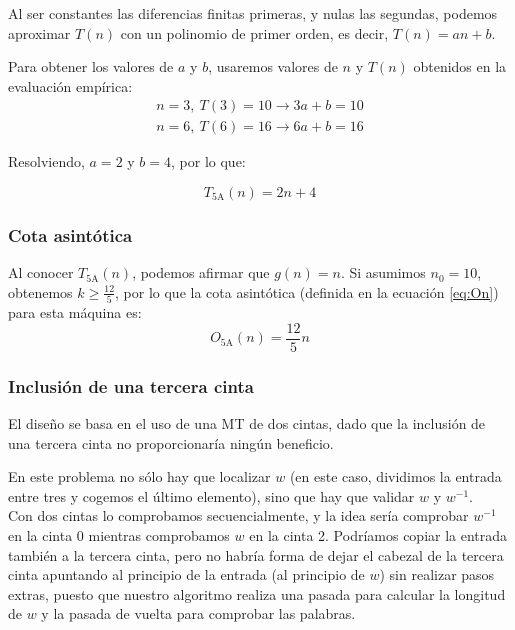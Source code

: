 Al ser constantes las diferencias finitas primeras, y nulas las segundas, podemos aproximar $T(n)$ con un polinomio de primer orden, es decir, $T(n) = an + b$.\medskip

Para obtener los valores de $a$ y $b$, usaremos valores de $n$ y $T(n)$ obtenidos en la evaluación empírica:
\begin{subequations}
    \begin{gather*}
        n = 3,\ T(3) = 10 \rightarrow 3a + b = 10 \\
        n = 6,\ T(6) = 16 \rightarrow 6a + b = 16
    \end{gather*}
\end{subequations}

Resolviendo, $a=2$ y $b=4$, por lo que:

\begin{equation}
    T_{\mathrm{5A}}(n) = 2n + 4
\end{equation}


\subsubsection*{Cota asintótica}
Al conocer $T_{\mathrm{5A}}(n)$, podemos afirmar que $g(n) = n$. Si asumimos $n_0 = 10$, obtenemos $k \geq \frac{12}{5}$, por lo que la cota asintótica (definida en la ecuación \ref{eq:On}) para esta máquina es:
\begin{equation}
    O_{\mathrm{5A}}(n) = \frac{12}{5} n
\end{equation}



\subsubsection*{Inclusión de una tercera cinta}
El diseño se basa en el uso de una MT de dos cintas, dado que la inclusión de una tercera cinta no proporcionaría ningún beneficio.

En este problema no sólo hay que localizar $w$ (en este caso, dividimos la entrada entre tres y cogemos el último elemento), sino que hay que validar $w$ y $w^{-1}$.\\
Con dos cintas lo comprobamos secuencialmente, y la idea sería comprobar $w^{-1}$ en la cinta 0 mientras comprobamos $w$ en la cinta 2.
Podríamos copiar la entrada también a la tercera cinta, pero no habría forma de dejar el cabezal de la tercera cinta apuntando al principio de la entrada (al principio de $w$) sin realizar pasos extras, puesto que nuestro algoritmo realiza una pasada para calcular la longitud de $w$ y la pasada de vuelta para comprobar las palabras.




